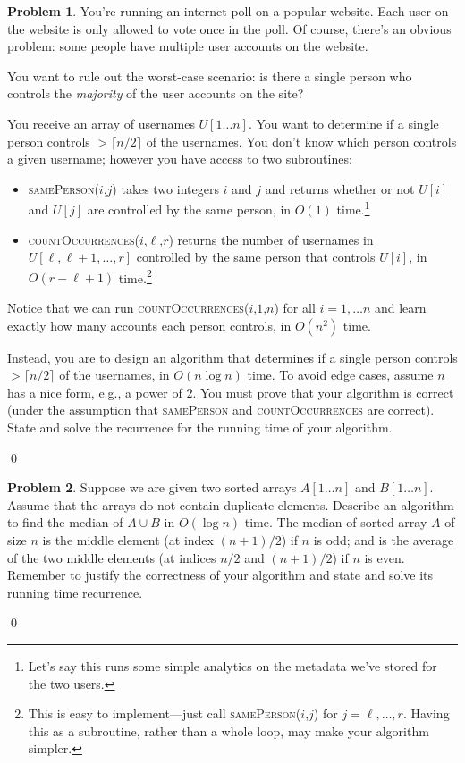 \documentclass[12pt]{article}
\theoremstyle{definition}
\newtheorem{question}{Problem}
\newenvironment{solution}{\bigskip\noindent{\it Solution.}  \ignorespaces}{\hfill\qed}
\begin{document}
\newpage
\begin{question}\label{majority}
  You're running an internet poll on a popular website.  Each user on the website is only allowed to vote once in the poll.  Of course, there's an obvious problem: some people have multiple user accounts on the website.

  You want to rule out the worst-case scenario: is there a single person who controls the \emph{majority} of the user accounts on the site?  

  You receive an array of usernames $U[1\ldots n]$.  You want to determine if a single person controls $> \lceil n/2 \rceil$ of the usernames.  You don't know which person controls a given username; however you have access to two subroutines:
  \begin{itemize}
    \item \textsc{samePerson($i$,$j$)} takes two integers $i$ and $j$ and returns whether or not $U[i]$ and $U[j]$ are controlled by the same person, in $O(1)$ time.\footnote{Let's say this runs some simple analytics on the metadata we've stored for the two users.}
    \item \textsc{countOccurrences($i$,$\ell$,$r$)} returns the number of usernames in $U[\ell, \ell+1,\ldots, r]$ controlled by the same person that controls $U[i]$, in $O(r - \ell + 1)$ time.\footnote{This is easy to implement---just call \textsc{samePerson($i$,$j$)} for $j = \ell, \ldots, r$.  Having this as a subroutine, rather than a whole loop, may make your algorithm simpler.}
  \end{itemize}

  Notice that we can run \textsc{countOccurrences($i$,$1$,$n$)} for all $i = 1,\ldots n$ and learn exactly how many accounts each person controls, in $O(n^2)$ time.

  Instead, you are to design an algorithm that determines if a single person controls $> \lceil n/2 \rceil$ of the usernames, in $O(n\log n)$ time.
To avoid edge cases, assume $n$ has a nice form, e.g., a power of $2$.
You must
prove that your algorithm is correct (under the assumption that \textsc{samePerson} and \textsc{countOccurrences} are correct). 
State and solve the recurrence for the running time of your algorithm.
\end{question}
\begin{solution}
\end{solution}


\newpage
\begin{question} 
Suppose we are given two sorted arrays $A[1 \ldots n]$ and $B[1 \ldots n]$. 
Assume that the arrays do not contain duplicate
elements. Describe an algorithm to find the median of $A \cup B$ in $O(\log n)$ time.
The median of sorted array $A$ of size $n$ is the middle element (at index $(n+1)/2$) if $n$ is odd; and is
the average of the two middle elements (at indices $n/2$ and $(n+1)/2$)
if $n$ is even.  Remember to {justify the correctness of your algorithm} 
and state and solve its running time recurrence.
\end{question}
\begin{solution}
\end{solution}
\end{document}

